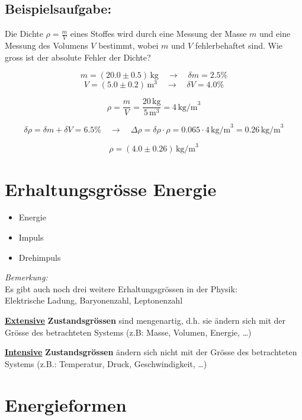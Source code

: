 \documentclass[a4paper, 8pt]{extarticle}
\begin{document}
\begin{landscape}
\begin{multicols*}{3}
\subsection{Beispielsaufgabe:} 
Die Dichte \( \rho = \frac{m}{V} \) eines Stoffes wird durch eine Messung der Masse \( m \) und eine Messung des Volumens \( V \) bestimmt, wobei \( m \) und \( V \) fehlerbehaftet sind. Wie gross ist der absolute Fehler der Dichte?

\[
m = (20.0 \pm 0.5) \, \text{kg} \quad \rightarrow \quad \delta m = 2.5\%
\]
\[
V = (5.0 \pm 0.2) \, \text{m}^3 \quad \rightarrow \quad \delta V = 4.0\%
\]

\[
\rho = \frac{m}{V} = \frac{20 \, \text{kg}}{5 \, \text{m}^3} = 4 \, \text{kg/m}^3
\]

\[
\delta \rho = \delta m + \delta V = 6.5\% \quad \rightarrow \quad \Delta \rho = \delta \rho \cdot \rho = 0.065 \cdot 4 \, \text{kg/m}^3 = 0.26 \, \text{kg/m}^3
\]

\[
\rho = (4.0 \pm 0.26) \, \text{kg/m}^3
\]

\section{Erhaltungsgrösse Energie}
\begin{itemize}
    \item Energie
    \item Impuls
    \item Drehimpuls
\end{itemize}

\bigskip

\textit{Bemerkung:} \\
Es gibt auch noch drei weitere Erhaltungsgrössen in der Physik: \\
Elektrische Ladung, Baryonenzahl, Leptonenzahl

\bigskip

\textbf{\underline{Extensive}} \textbf{Zustandsgrössen} sind mengenartig, d.h. sie ändern sich mit der Grösse des betrachteten Systems (z.B: Masse, Volumen, Energie, \dots)

\bigskip

\textbf{\underline{Intensive}} \textbf{Zustandsgrössen} ändern sich nicht mit der Grösse des betrachteten Systems (z.B.: Temperatur, Druck, Geschwindigkeit, \dots)

\bigskip

\section*{Energieformen}


\end{multicols*}
\end{landscape}
\end{document}
